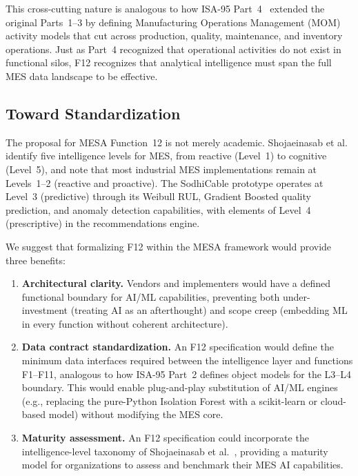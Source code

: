 This cross-cutting nature is analogous to how ISA-95 Part~4~\cite{isa95part4}
extended the original Parts~1--3 by defining Manufacturing Operations Management
(MOM) activity models that cut across production, quality, maintenance, and
inventory operations.  Just as Part~4 recognized that operational activities do
not exist in functional silos, F12 recognizes that analytical intelligence must
span the full MES data landscape to be effective.


\subsection{Toward Standardization}

The proposal for MESA Function~12 is not merely academic.  Shojaeinasab et
al.~\cite{shojaeinasab2022} identify five intelligence levels for MES, from
reactive (Level~1) to cognitive (Level~5), and note that most industrial MES
implementations remain at Levels~1--2 (reactive and proactive).  The SodhiCable
prototype operates at Level~3 (predictive) through its Weibull RUL,
Gradient Boosted quality prediction, and anomaly detection capabilities, with
elements of Level~4 (prescriptive) in the recommendations engine.

We suggest that formalizing F12 within the MESA framework would provide three
benefits:

\begin{enumerate}[leftmargin=2em, itemsep=2pt]
\item \textbf{Architectural clarity.}  Vendors and implementers would have a
defined functional boundary for AI/ML capabilities, preventing both
under-investment (treating AI as an afterthought) and scope creep (embedding ML
in every function without coherent architecture).

\item \textbf{Data contract standardization.}  An F12 specification would define
the minimum data interfaces required between the intelligence layer and
functions F1--F11, analogous to how ISA-95 Part~2 defines object models for the
L3--L4 boundary.  This would enable plug-and-play substitution of AI/ML engines
(e.g., replacing the pure-Python Isolation Forest with a scikit-learn or
cloud-based model) without modifying the MES core.

\item \textbf{Maturity assessment.}  An F12 specification could incorporate the
intelligence-level taxonomy of Shojaeinasab et al.~\cite{shojaeinasab2022},
providing a maturity model for organizations to assess and benchmark their MES
AI capabilities.
\end{enumerate}

